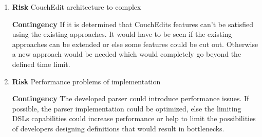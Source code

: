 \documentclass[10pt,a4paper,oneside]{scrartcl}
\begin{document}
\begin{enumerate}
  \item \textbf{Risk} CouchEdit architecture to complex

        \textbf{Contingency} If it is determined that CouchEdits features can't be satisfied using the existing approaches. It would have to be seen if the existing approaches can be extended or else some features could be cut out. Otherwise a new approach would be needed which would completely go beyond the defined time limit. 

  \item \textbf{Risk} Performance problems of implementation

        \textbf{Contingency} The developed parser could introduce performance issues. If possible, the parser implementation could be optimized, else the limiting DSLs capabilities could increase performance or help to limit the possibilities of developers designing definitions that would result in bottlenecks.
\end{enumerate}

\nocite{*}
\printbibliography
\end{document}

